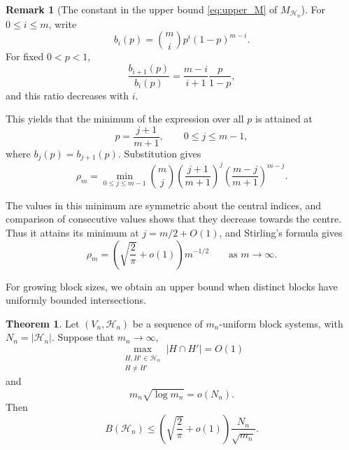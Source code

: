 \documentclass[10pt]{article}
\theoremstyle{definition}
\newtheorem{theorem}[thm]{Theorem}
\newtheorem{remark}[thm]{Remark}
\begin{document}
	\begin{remark}[The constant in the upper bound \eqref{eq:upper_M} of $M_{\mathcal H_n}$]
		For \(0\leq i\leq m\), write
		\[
		b_i(p)=\binom mi p^i(1-p)^{m-i}.
		\]
		For fixed \(0<p<1\),
		\[
		\frac{b_{i+1}(p)}{b_i(p)}
		=
		\frac{m-i}{i+1}\frac{p}{1-p},
		\]
		and this ratio decreases with \(i\). 
		

		This yields that the minimum of the expression  over all \(p\) is attained at
		\[
		p=\frac{j+1}{m+1},
		\qquad 0\leq j\leq m-1,
		\]
		where \(b_j(p)=b_{j+1}(p)\). Substitution gives
		\begin{equation}\label{eq:rho}
			\rho_m=
			\min_{0\leq j\leq m-1}
			\binom mj
			\left(\frac{j+1}{m+1}\right)^j
			\left(\frac{m-j}{m+1}\right)^{m-j}.    
		\end{equation}
		
		
		The values in this minimum are symmetric about the central indices, and
		comparison of consecutive values shows that they decrease towards the
		centre. Thus it attains its minimum at \(j=m/2+O(1)\), and
		Stirling's formula gives
		\[
		\rho_m=
		\left(\sqrt{\frac{2}{\pi}}+o(1)\right)m^{-1/2}
		\qquad\text{as }m\to\infty.
		\] 
	\end{remark}
	
	{For growing block sizes, we obtain an upper bound when distinct blocks have uniformly bounded intersections.}
	
	\begin{theorem}
		\label{thm:growing-upper}
		{Let \((V_n,\mathcal H_n)\) be a sequence of \(m_n\)-uniform block systems,
			with \(N_n=|\mathcal H_n|\). Suppose that \(m_n\to\infty\),
			\[
			\max_{\substack{H,H'\in\mathcal H_n\\H\neq H'}}|H\cap H'|=O(1)
			\]
			and
			\[
			m_n\sqrt{\log m_n}=o(N_n).
			\]
			Then
			\[
			B(\mathcal H_n)\leq
			\left(\sqrt{\frac{2}{\pi}}+o(1)\right)
			\frac{N_n}{\sqrt{m_n}}.
			\]}
	\end{theorem}
	
\end{document}
